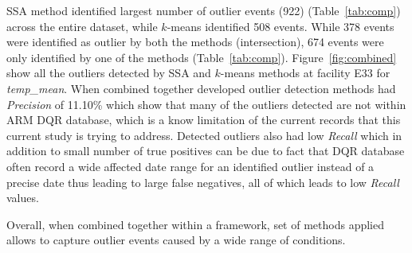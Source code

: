 
SSA method identified largest number of outlier events (922)
(Table~\ref{tab:comp}) across the entire dataset, while $k$-means
identified 508 events. While 378 events were identified as outlier by
both the methods (intersection), 674 events were only identified by one
of the methods (Table~\ref{tab:comp}).
Figure~\ref{fig:combined} show all the outliers detected by SSA and
$k$-means methods at facility E33 for \textit{temp\_mean}. 
When combined together developed outlier detection methods had
\textit{Precision} of 11.10\% which show that many of the outliers
detected are not within ARM DQR database, which is a know limitation of
the current records that this current study is trying to address.
Detected outliers also had low \textit{Recall} which in addition to small
number of true positives can be due to fact that DQR database often
record a wide affected date range for an identified outlier instead of a
precise date thus leading to large false negatives, all of which leads
to low \textit{Recall} values.

Overall, when combined together within a framework, set of methods applied allows
to capture outlier events caused by a wide range of conditions. 


